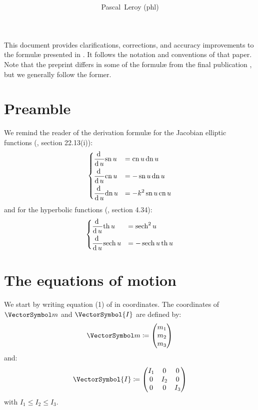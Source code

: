 \documentclass[10pt, a4paper, twoside]{basestyle}
\title{%
\textdisplay{%
On an Article by Celledoni et al.%
}%
}
\author{Pascal~Leroy (phl)}
\begin{document}
\maketitle
\begin{sloppypar}
\noindent
This document provides clarifications, corrections, and accuracy improvements to the formulæ presented in \cite{Celledoni2007}.  It follows the notation
and conventions of that paper.  Note that the preprint \cite{Celledoni2007} differs in some of the formulæ from the final publication \cite{Celledoni2008},
but we generally follow the former.
\end{sloppypar}

\section*{Preamble}
We remind the reader of the derivation formulæ for the Jacobian elliptic functions (\cite{NistHMF2010}, section 22.13(i)):
\[
\begin{dcases}
\frac{\operatorname{d}^{} {}}{{\operatorname{d} {u}}^{}}{\operatorname{sn} u} &= \operatorname{cn} u \operatorname{dn} u \\
\frac{\operatorname{d}^{} {}}{{\operatorname{d} {u}}^{}}{\operatorname{cn} u} &= -\operatorname{sn} u \operatorname{dn} u \\
\frac{\operatorname{d}^{} {}}{{\operatorname{d} {u}}^{}}{\operatorname{dn} u} &= -k^2 \operatorname{sn} u \operatorname{cn} u
\end{dcases}
\]
and for the hyperbolic functions (\cite{NistHMF2010}, section 4.34):
\[
\begin{dcases}
\frac{\operatorname{d}^{} {}}{{\operatorname{d} {u}}^{}}{\operatorname{th} u} &= \operatorname{sech}^2 u \\
\frac{\operatorname{d}^{} {}}{{\operatorname{d} {u}}^{}}{\operatorname{sech} u} &= -\operatorname{sech} u \operatorname{th} u
\end{dcases}
\]

\section*{The equations of motion}
We start by writing equation (1) of \cite{Celledoni2007} in coordinates.  The coordinates of $\vm$ and $\VectorSymbol{I}$ are defined by:
\[
\vm\DefineAs
\begin{pmatrix}
m_1 \\ m_2 \\ m_3
\end{pmatrix}
\]
and:
\[
\VectorSymbol{I}\DefineAs
\begin{pmatrix}
I_1 & 0 & 0 \\ 0 & I_2 & 0 \\ 0 & 0 & I_3
\end{pmatrix}
\]
with $I_1 \leq I_2 \leq I_3$.
\end{document}

